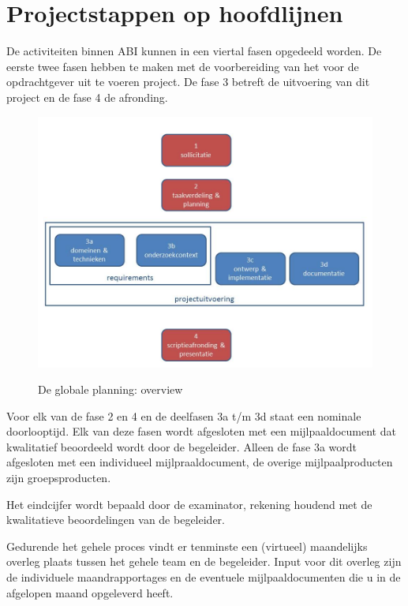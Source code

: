 \section{Projectstappen op hoofdlijnen}

De activiteiten binnen ABI kunnen in een viertal fasen opgedeeld worden.
De eerste twee fasen hebben te maken met de voorbereiding van het voor de
opdrachtgever uit te voeren project. De fase 3 betreft de uitvoering van dit
project en de fase 4 de afronding.

\begin{figure}[!ht]
    \includegraphics[width=\textwidth]{./overview.jpg}
    \label{fig:overview}
    \caption{De globale planning: overview}
\end{figure}

Voor elk van de fase 2 en 4 en de deelfasen 3a t/m 3d staat een nominale
doorlooptijd. Elk van deze fasen wordt afgesloten met een mijlpaaldocument
dat kwalitatief beoordeeld wordt door de begeleider. Alleen de fase 3a
wordt afgesloten met een individueel mijlpraaldocument,  de overige mijlpaalproducten
zijn groepsproducten.

Het eindcijfer wordt bepaald door de examinator, rekening houdend met de
kwalitatieve beoordelingen van de begeleider.

Gedurende het gehele proces vindt er tenminste een (virtueel) maandelijks
overleg plaats tussen het gehele team en de begeleider. Input voor dit
overleg zijn de individuele maandrapportages en de eventuele mijlpaaldocumenten
die u in de afgelopen maand opgeleverd heeft.


